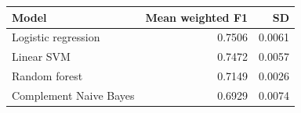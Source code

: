\begin{tabular}{lrr}
\toprule
Model & Mean weighted F1 & SD \\
\midrule
Logistic regression & 0.7506 & 0.0061 \\
Linear SVM & 0.7472 & 0.0057 \\
Random forest & 0.7149 & 0.0026 \\
Complement Naive Bayes & 0.6929 & 0.0074 \\
\bottomrule
\end{tabular}
